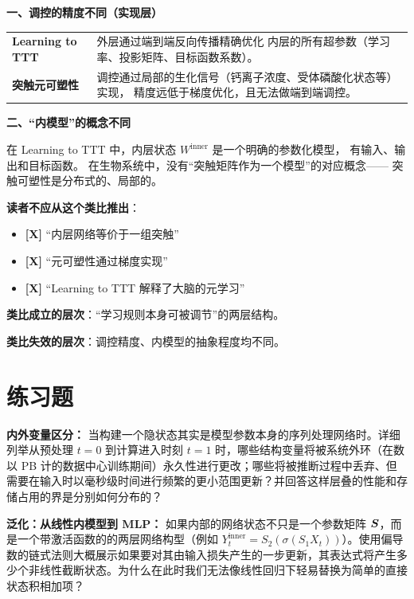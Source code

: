 \begin{analogyboundarybox}[title=这个类比在哪里失效]

\textbf{一、调控的精度不同（实现层）}

\begin{tabular}{p{5cm} p{8cm}}
\textbf{Learning to TTT}
& 外层通过端到端反向传播精确优化
  内层的所有超参数（学习率、投影矩阵、目标函数系数）。 \\
\textbf{突触元可塑性}
& 调控通过局部的生化信号（钙离子浓度、受体磷酸化状态等）实现，
  精度远低于梯度优化，且无法做端到端调控。 \\
\end{tabular}

\medskip\textbf{二、``内模型''的概念不同}

在 Learning to TTT 中，内层状态 $W^{\text{inner}}$ 是一个明确的参数化模型，
有输入、输出和目标函数。
在生物系统中，没有``突触矩阵作为一个模型''的对应概念——
突触可塑性是分布式的、局部的。

\medskip\textbf{读者不应从这个类比推出}：
\begin{itemize}
  \item \textbf{[X]} ``内层网络等价于一组突触''
  \item \textbf{[X]} ``元可塑性通过梯度实现''
  \item \textbf{[X]} ``Learning to TTT 解释了大脑的元学习''
\end{itemize}

\medskip
\textbf{类比成立的层次}：``学习规则本身可被调节''的两层结构。

\textbf{类比失效的层次}：调控精度、内模型的抽象程度均不同。

\end{analogyboundarybox}

\section{练习题}
\label{sec:l2l_exercises}

\begin{exercise}
\textbf{内外变量区分：}
当构建一个隐状态其实是模型参数本身的序列处理网络时。详细列举从预处理 $t=0$ 到计算进入时刻 $t=1$ 时，哪些结构变量将被系统外环（在数以 PB 计的数据中心训练期间）永久性进行更改；哪些将被推断过程中丢弃、但需要在输入时以毫秒级时间进行频繁的更小范围更新？并回答这样层叠的性能和存储占用的界是分别如何分布的？
\end{exercise}

\begin{exercise}
\textbf{泛化：从线性内模型到 MLP：}
如果内部的网络状态不只是一个参数矩阵 $\boldsymbol{S}$，而是一个带激活函数的的两层网络构型（例如 $Y_t^{\text{inner}} = S_2(\sigma(S_1 X_t))$）。使用偏导数的链式法则大概展示如果要对其由输入损失产生的一步更新，其表达式将产生多少个非线性截断状态。为什么在此时我们无法像线性回归下轻易替换为简单的直接状态积相加项？
\end{exercise}

